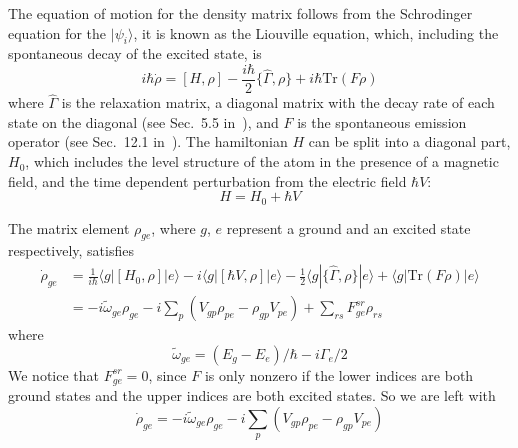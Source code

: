 \documentclass[11pt,letter]{article}
\begin{document}
The equation of motion for the density matrix follows from the Schrodinger
equation for the $|\psi_{i}\rangle$,  it is known as the Liouville equation,
which, including the spontaneous decay of the excited state, 
is~\cite{auzinsh2010optically} 
\begin{equation}
  i \hbar \dot{\rho} = 
  [H, \rho] - \frac{i\hbar}{2}\lbrace \hat{\Gamma}, \rho \rbrace + i\hbar\text{Tr}( F \rho ) 
\end{equation}
where $\hat{\Gamma}$ is the relaxation matrix, a diagonal matrix with the decay
rate of each state on the diagonal (see Sec.~5.5
in~\cite{auzinsh2010optically}), and $F$ is the spontaneous emission operator
(see Sec.~12.1 in~\cite{auzinsh2010optically}).  The hamiltonian
$H$ can be split into a diagonal part, $H_{0}$, which includes the
level structure of the atom in the presence of a magnetic field, and the time
dependent perturbation from the electric field $\hbar V$:
\begin{equation}
  H = H_{0} + \hbar V
\end{equation}

The matrix element $\rho_{ge}$, where $g$, $e$ represent a ground and an
excited state respectively, satisfies
\begin{equation}
\begin{split}
  \dot{\rho}_{ge}  & =  
   \frac{1}{i\hbar} \langle g | [ H_{0}, \rho ] | e \rangle  
 - i \langle g | [ \hbar V, \rho ] | e \rangle 
 - \frac{1}{2}\langle g | \lbrace \hat{\Gamma}, \rho \rbrace | e \rangle 
 + \langle g | \text{Tr}( F \rho ) | e \rangle  \\
 & = -i \tilde{\omega}_{ge}  \rho_{ge}  
     -i \sum_{p}\left( V_{gp} \rho_{pe} - \rho_{gp}V_{pe} \right) 
     +  \sum_{rs} F_{ge}^{sr} \rho_{rs}
\end{split} 
\end{equation}
where 
\begin{equation}
  \tilde{\omega}_{ge} = (E_{g} - E_{e})/\hbar - i \Gamma_{e} /2 
\end{equation}
We notice that $F_{ge}^{sr} = 0$, since $F$ is only nonzero if the lower
indices are both ground states and the upper indices are both excited states.
So we are left with 
\begin{equation}
  \dot{\rho}_{ge}  =  
     -i \tilde{\omega}_{ge}  \rho_{ge}  
     -i \sum_{p}\left( V_{gp} \rho_{pe} - \rho_{gp}V_{pe} \right) 
\end{equation}
\end{document}
